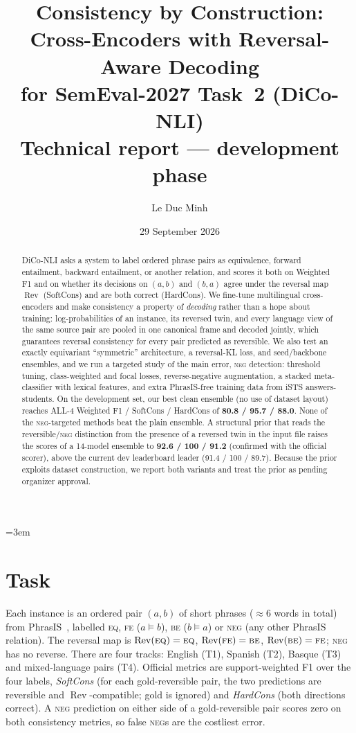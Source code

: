 \documentclass[11pt,a4paper]{article}
\title{Consistency by Construction: Cross-Encoders with Reversal-Aware Decoding\\
for SemEval-2027 Task~2 (DiCo-NLI)\\[4pt]
\large Technical report --- development phase}
\author{Le Duc Minh}
\date{29 September 2026}
\newcommand{\rev}{\operatorname{Rev}}
\newcommand{\EQ}{\textsc{eq}}
\newcommand{\FE}{\textsc{fe}}
\newcommand{\BE}{\textsc{be}}
\newcommand{\NEG}{\textsc{neg}}
\begin{document}
\emergencystretch=3em
\maketitle

\begin{abstract}
DiCo-NLI asks a system to label ordered phrase pairs as equivalence, forward
entailment, backward entailment, or another relation, and scores it both on
Weighted F1 and on whether its decisions on $(a,b)$ and $(b,a)$ agree under the
reversal map $\rev$ (SoftCons) and are both correct (HardCons). We fine-tune
multilingual cross-encoders and make consistency a property of \emph{decoding}
rather than a hope about training: log-probabilities of an instance, its reversed
twin, and every language view of the same source pair are pooled in one
canonical frame and decoded jointly, which guarantees reversal consistency for
every pair predicted as reversible. We also test an exactly equivariant
``symmetric'' architecture, a reversal-KL loss, and seed/backbone ensembles,
and we run a targeted study of the main error, \NEG{} detection: threshold
tuning, class-weighted and focal losses, reverse-negative augmentation, a
stacked meta-classifier with lexical features, and extra PhrasIS-free training
data from iSTS answers-students. On the development set, our best clean
ensemble (no use of dataset layout) reaches ALL-4 Weighted F1 / SoftCons /
HardCons of \textbf{80.8 / 95.7 / 88.0}. None of the \NEG{}-targeted methods
beat the plain ensemble. A structural prior that reads the reversible/\NEG{}
distinction from the presence of a reversed twin in the input file raises the
scores of a 14-model ensemble to \textbf{92.6 / 100 / 91.2} (confirmed with the official scorer), above the current dev leaderboard leader
(91.4 / 100 / 89.7). Because the prior exploits dataset construction, we report
both variants and treat the prior as pending organizer approval.
\end{abstract}

\section{Task}

Each instance is an ordered pair $(a,b)$ of short phrases ($\approx$6 words in
total) from PhrasIS~\cite{phrasis}, labelled \EQ, \FE{} ($a \models b$), \BE{}
($b \models a$) or \NEG{} (any other PhrasIS relation). The reversal map is
$\rev(\EQ)=\EQ$, $\rev(\FE)=\BE$, $\rev(\BE)=\FE$; \NEG{} has no reverse.
There are four tracks: English (T1), Spanish (T2), Basque (T3) and mixed-language
pairs (T4). Official metrics are support-weighted F1 over the four labels,
\emph{SoftCons} (for each gold-reversible pair, the two predictions are
reversible and $\rev$-compatible; gold is ignored) and \emph{HardCons} (both
directions correct). A \NEG{} prediction on either side of a gold-reversible
pair scores zero on both consistency metrics, so false \NEG{}s are the costliest
error.
\end{document}
